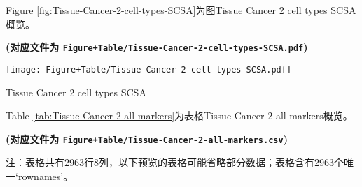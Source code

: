 \documentclass[
]{article}
\begin{document}
Figure \ref{fig:Tissue-Cancer-2-cell-types-SCSA}为图Tissue Cancer 2 cell types SCSA概览。

\textbf{(对应文件为 \texttt{Figure+Table/Tissue-Cancer-2-cell-types-SCSA.pdf})}

\def\@captype{figure}
\begin{center}
\texttt{[image: Figure+Table/Tissue-Cancer-2-cell-types-SCSA.pdf]}
\caption{Tissue Cancer 2 cell types SCSA}\label{fig:Tissue-Cancer-2-cell-types-SCSA}
\end{center}

Table \ref{tab:Tissue-Cancer-2-all-markers}为表格Tissue Cancer 2 all markers概览。

\textbf{(对应文件为 \texttt{Figure+Table/Tissue-Cancer-2-all-markers.csv})}

\begin{center}\begin{tcolorbox}[colback=gray!10, colframe=gray!50, width=0.9\linewidth, arc=1mm, boxrule=0.5pt]注：表格共有2963行8列，以下预览的表格可能省略部分数据；表格含有2963个唯一`rownames'。
\end{tcolorbox}
\end{center}
\end{document}
